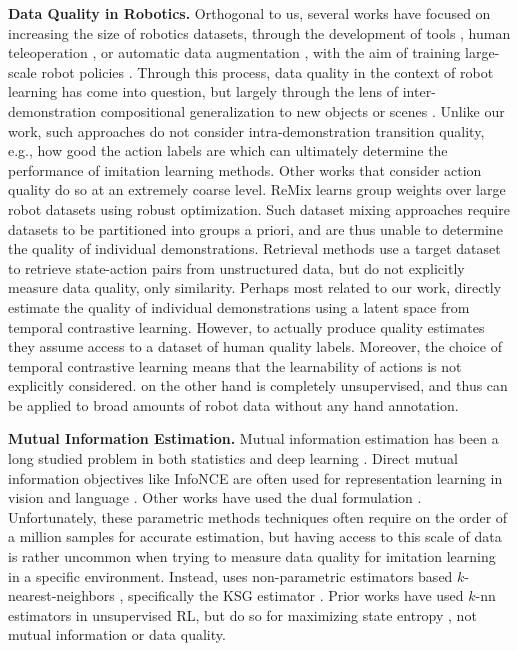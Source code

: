 \textbf{Data Quality in Robotics.} Orthogonal to us, several works have focused on increasing the size of robotics datasets, through the development of tools \citep{pmlr-v155-young21a, chi2024universal}, human teleoperation \citep{droid,openx,jang2022bc,dasari2019robonet,sharma2018multiple,mandlekar2018roboturk,pinto2016supersizing, bharadhwaj2024roboagent, robocasa2024}, or automatic data augmentation  \citep{ha2023scalingup,mandlekar2023mimicgen, belkhale2023hydra, mandi2022cacti}, with the aim of training large-scale robot policies \citep{rt1, rt2, levine2018learning, octo}. Through this process, data quality in the context of robot learning has come into question, but largely through the lens of inter-demonstration compositional generalization to new objects or scenes \citep{burns2023makes, xie2023decomposing,gao2024efficient, lin2024datascalinglawsimitation}. Unlike our work, such approaches do not consider intra-demonstration transition quality, e.g., how good the action labels are which can ultimately determine the performance of imitation learning methods. Other works that consider action quality do so at an extremely coarse level. ReMix \citep{hejna2024remix} learns group weights over large robot datasets using robust optimization. Such dataset mixing approaches require datasets to be partitioned into groups a priori, and are thus unable to determine the quality of individual demonstrations. Retrieval methods \citep{nasiriany2022sailor,du2023behavior,lin2024flowretrieval} use a target dataset to retrieve state-action pairs from unstructured data, but do not explicitly measure data quality, only similarity. Perhaps most related to our work, \citet{kuhar2023learning} directly estimate the quality of individual demonstrations using a latent space from temporal contrastive learning. However, to actually produce quality estimates they assume access to a dataset of human quality labels. Moreover, the choice of temporal contrastive learning means that the learnability of actions is not explicitly considered. \abv on the other hand is completely unsupervised, and thus can be applied to broad amounts of robot data without any hand annotation.

\textbf{Mutual Information Estimation.} Mutual information estimation has been a long studied problem in both statistics and deep learning \citep{poole2019variational}. Direct mutual information objectives like InfoNCE \citep{oord2018representation} are often used for representation learning in vision \citep{chen2020simple} and language \citep{zhang2020unsupervised}. Other works have used the dual formulation \citep{belghazi2018mutual}. Unfortunately, these parametric methods techniques often require on the order of a million samples for accurate estimation, but having access to this scale of data is rather uncommon when trying to measure data quality for imitation learning in a specific environment. Instead, \abv uses non-parametric estimators based $k$-nearest-neighbors \citep{kozachenko1987sample, singh2003nearest}, specifically the KSG estimator \citep{kraskov2004estimating,gao2018demystifying}. Prior works have used $k$-nn estimators in unsupervised RL, but do so for maximizing state entropy \citep{liu2021behavior, kim2024accelerating}, not mutual information or data quality.


